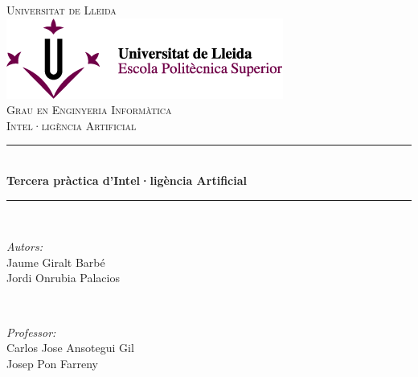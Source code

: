 \documentclass[11pt]{article}
\begin{document}
\begin{titlepage}

\newcommand{\HRule}{\rule{\linewidth}{0.5mm}} %

\center %
 

\textsc{\LARGE Universitat de Lleida}\\[1cm] %
\includegraphics[scale=0.75]{Images/eps.png}\\[0.65cm] %
\textsc{\Large Grau en Enginyeria Informàtica}\\[0.3cm] %
\textsc{\large Intel·ligència Artificial}\\[0.5cm] %


\HRule \\[0.4cm]
{\huge \bfseries Tercera pràctica d'Intel·ligència Artificial}\\[0.0cm]
\HRule \\[1cm] 

\begin{minipage}{0.4\textwidth}
\begin{flushleft} \large
\emph{Autors:}\\
Jaume Giralt Barbé\\
Jordi Onrubia Palacios\\
\end{flushleft}
\end{minipage}
~
\begin{minipage}{0.4\textwidth}
\begin{flushright} \large
\emph{Professor:} \\
Carlos Jose Ansotegui Gil\\
Josep Pon Farreny
\end{flushright}
\end{minipage}\\[4cm]


\end{titlepage}
\end{document}
